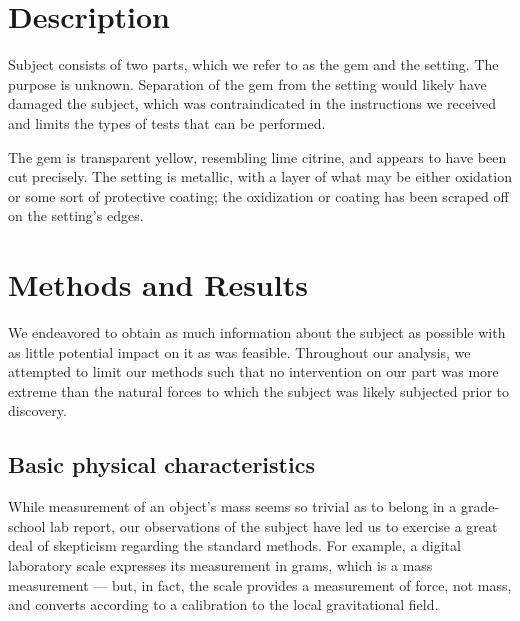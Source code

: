 \documentclass[10pt]{article}
\begin{document}
\maketitle


\section{Description}

Subject consists of two parts, which we refer to as the gem and the setting. The purpose is unknown. Separation of the gem from the setting would likely have damaged the subject, which was contraindicated in the instructions we received and limits the types of tests that can be performed.

The gem is transparent yellow, resembling lime citrine, and appears to have been cut precisely.
The setting is metallic, with a layer of what may be either oxidation or some sort of protective coating; the oxidization or coating has been scraped off on the setting's edges.

\section{Methods and Results}
We endeavored to obtain as much information about the subject as possible with as little potential impact on it as was feasible.
Throughout our analysis, we attempted to limit our methods such that no intervention on our part was more extreme than the natural forces to which the subject was likely subjected prior to discovery.

\subsection{Basic physical characteristics}
While measurement of an object's mass seems so trivial as to belong in a grade-school lab report, our observations of the subject have led us to exercise a great deal of skepticism regarding the standard methods.
For example, a digital laboratory scale expresses its measurement in grams, which is a mass measurement --- but, in fact, the scale provides a measurement of force, not mass, and converts according to a calibration to the local gravitational field.
\end{document}
